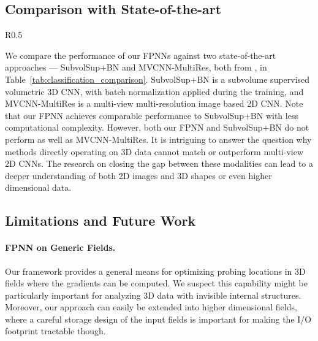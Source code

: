 \documentclass{article}
\begin{document}
\subsection{Comparison with State-of-the-art}
\begin{wraptable}{R}{0.5\linewidth}
\vspace{-1.7cm}
	\begin{center}
	\end{center}
	\vspace{-0.3cm}
	\caption{Comparison with state-of-the-art methods.}
	\label{tab:classification_comparison}
	\vspace{-0.2cm}
\end{wraptable}

We compare the performance of our FPNNs against two state-of-the-art approaches --- SubvolSup+BN and MVCNN-MultiRes, both from \cite{qi2016volumetric}, in Table~\ref{tab:classification_comparison}. SubvolSup+BN is a subvolume supervised volumetric 3D CNN, with batch normalization applied during the training, and MVCNN-MultiRes is a multi-view multi-resolution image based 2D CNN. Note that our FPNN achieves comparable performance to SubvolSup+BN with less computational complexity. However, both our FPNN and SubvolSup+BN do not perform as well as MVCNN-MultiRes. It is intriguing to answer the question why methods directly operating on 3D data cannot match or outperform multi-view 2D CNNs. The research on closing the gap between these modalities can lead to a deeper understanding of both 2D images and 3D shapes or even higher dimensional data.

\subsection{Limitations and Future Work}

\paragraph{FPNN on Generic Fields.}
Our framework provides a general means for optimizing probing locations in 3D fields where the gradients can be computed. We suspect this capability might be particularly important for analyzing 3D data with invisible internal structures. Moreover, our approach can easily be extended into higher dimensional fields, where a careful storage design of the input fields is important for making the I/O footprint tractable though.
\end{document}
